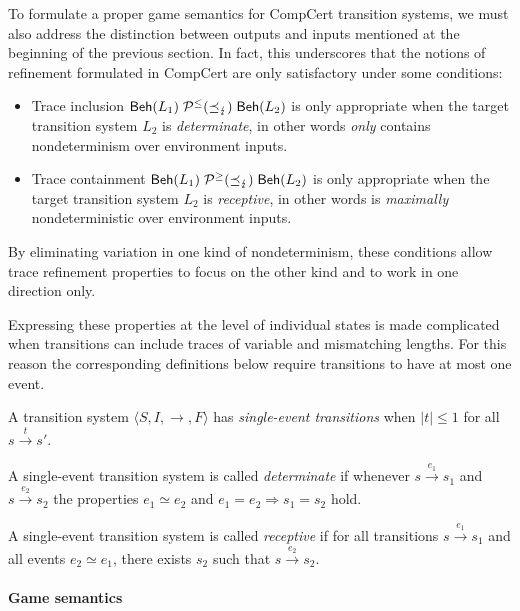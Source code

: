 \documentclass[sigplan,10pt,authordraft]{acmart}
\begin{document}
To formulate a proper game semantics for
CompCert transition systems,
we must also address the distinction between
outputs and inputs mentioned
at the beginning of the previous section.
In fact,
this underscores that
the notions of refinement
formulated in CompCert
are only satisfactory under some conditions:
\begin{itemize}
  \item
    Trace inclusion
    $ \mathsf{Beh} (L_1)
     \mathrel{\mathcal{P}^\le(\preceq_\lightning)}
      \mathsf{Beh} (L_2)$
    is only appropriate when
    the target transition system $L_2$
    is \emph{determinate},
    in other words \emph{only} contains nondeterminism
    over environment inputs.
  \item
    Trace containment
    $ \mathsf{Beh} (L_1)
     \mathrel{\mathcal{P}^\ge(\preceq_\lightning)}
      \mathsf{Beh} (L_2)$
    is only appropriate when
    the target transition system $L_2$
    is \emph{receptive},
    in other words is \emph{maximally} nondeterministic
    over environment inputs.
\end{itemize}
By eliminating variation in one kind of nondeterminism,
these conditions allow trace refinement properties
to focus on the other kind
and to work in one direction only.

Expressing these properties at the level of individual states
is made complicated when transitions can include
traces of variable and mismatching lengths.
For this reason the corresponding definitions below
require transitions to have at most one event.

\begin{definition} %
A transition system
$\langle S, I, {\rightarrow}, F \rangle$
has \emph{single-event transitions}
when $|t| \le 1$ for all $s \stackrel{t}{\rightarrow} s'$.

A single-event transition system is called
\emph{determinate}
if whenever
$s \stackrel{e_1}{\longrightarrow} s_1$ and
$s \stackrel{e_2}{\longrightarrow} s_2$
the properties $e_1 \simeq e_2$ and $e_1 = e_2 \Rightarrow s_1 = s_2$ hold.

A single-event transition system is called
\emph{receptive}
if for all transitions $s \stackrel{e_1}{\longrightarrow} s_1$
and all events $e_2 \simeq e_1$,
there exists $s_2$ such that
$s \stackrel{e_2}{\longrightarrow} s_2$.
\end{definition}

\paragraph{Game semantics}
\end{document}
